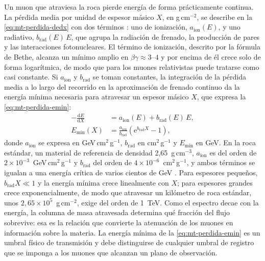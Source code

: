 Un muon que atraviesa la roca pierde energía de forma prácticamente continua. La pérdida media por unidad de espesor másico $X$, en g\,cm$^{-2}$, se describe en la \cref{eq:mt-perdida-dedx} con dos términos \parencite{groom2001,pdg2022}: uno de ionización, $a_{\mathrm{ion}}(E)$, y uno radiativo, $b_{\mathrm{rad}}(E)\,E$, que agrupa la radiación de frenado, la producción de pares y las interacciones fotonucleares. El término de ionización, descrito por la fórmula de Bethe, alcanza un mínimo amplio en $\beta\gamma\approx3$--$4$ y por encima de él crece solo de forma logarítmica, de modo que para los muones relativistas puede tratarse como casi constante. Si $a_{\mathrm{ion}}$ y $b_{\mathrm{rad}}$ se toman constantes, la integración de la pérdida media a lo largo del recorrido en la aproximación de frenado continuo da la energía mínima necesaria para atravesar un espesor másico $X$, que expresa la \cref{eq:mt-perdida-emin}:
\begin{subequations}\label{eq:mt-perdida}
\begin{align}
-\frac{\mathrm dE}{\mathrm dX}&=a_{\mathrm{ion}}(E)+b_{\mathrm{rad}}(E)\,E,\label{eq:mt-perdida-dedx}\\
E_{\min}(X)&=\frac{a_{\mathrm{ion}}}{b_{\mathrm{rad}}}\left(\mathrm e^{b_{\mathrm{rad}}X}-1\right),\label{eq:mt-perdida-emin}
\end{align}
\end{subequations}
donde $a_{\mathrm{ion}}$ se expresa en GeV\,cm$^{2}$\,g$^{-1}$, $b_{\mathrm{rad}}$ en cm$^{2}$\,g$^{-1}$ y $E_{\min}$ en GeV. En la roca estándar, un material de referencia de densidad 2,65~g\,cm$^{-3}$, $a_{\mathrm{ion}}$ es del orden de $2\times10^{-3}$~GeV\,cm$^{2}$\,g$^{-1}$ y $b_{\mathrm{rad}}$ del orden de $4\times10^{-6}$~cm$^{2}$\,g$^{-1}$, y ambos términos se igualan a una energía crítica de varios cientos de GeV \parencite{groom2001}. Para espesores pequeños, $b_{\mathrm{rad}}X\ll1$ y la energía mínima crece linealmente con $X$; para espesores grandes crece exponencialmente, de modo que atravesar un kilómetro de roca estándar, unos $2{,}65\times10^{5}$~g\,cm$^{-2}$, exige del orden de 1~TeV. Como el espectro decae con la energía, la columna de masa atravesada determina qué fracción del flujo sobrevive: esa es la relación que convierte la atenuación de los muones en información sobre la materia. La energía mínima de la \cref{eq:mt-perdida-emin} es un umbral físico de transmisión y debe distinguirse de cualquier umbral de registro que se imponga a los muones que alcanzan un plano de observación.


